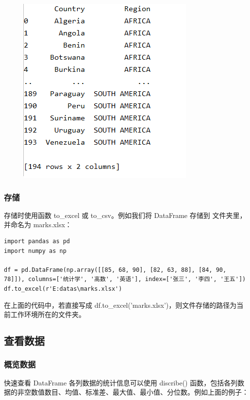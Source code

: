 \begin{figure}[!ht]
\centering
  \includegraphics[scale=0.7]{figure/chapter2/pandas7.png}
\end{figure}
\subsubsection{存储}

存储时使用函数 to\_excel 或 to\_csv。例如我们将 DataFrame 存储到  文件夹里，并命名为 marks.xlsx：

\begin{lstlisting}[Language=Python]
import pandas as pd
import numpy as np

df = pd.DataFrame(np.array([[85, 68, 90], [82, 63, 88], [84, 90, 78]]), columns=['统计学', '高数', '英语'], index=['张三', '李四', '王五'])
df.to_excel(r'E:datas\marks.xlsx')
\end{lstlisting}

在上面的代码中，若直接写成 df.to\_excel('marks.xlsx')，则文件存储的路径为当前工作环境所在的文件夹。


\subsection{查看数据}

\subsubsection{概览数据}
快速查看 DataFrame 各列数据的统计信息可以使用 discribe() 函数，包括各列数据的非空数值数目、均值、标准差、最大值、最小值、分位数。例如上面的例子：

